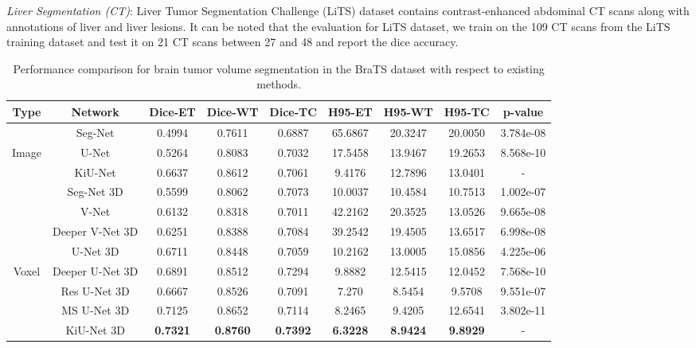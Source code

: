 \documentclass[journal,twoside,web]{ieeecolor}
\begin{document}
\noindent\textit{Liver Segmentation (CT)}:  Liver Tumor Segmentation Challenge (LiTS) dataset \cite{bilic2019liver} contains contrast-­enhanced abdominal CT scans along with annotations of liver and liver lesions.  It can be noted that the evaluation for LiTS dataset, we train on the 109 CT scans from the LiTS training dataset and test it on 21 CT scans between 27 and 48 and report the dice accuracy. 




\begin{table*}[]
	\caption{Performance comparison for brain tumor volume segmentation in the BraTS dataset with respect to existing methods.}
	\begin{tabular}{c|c|c|c|c|c|c|c|c}
		\hline
		Type & Network & Dice-ET & Dice-WT & Dice-TC & H95-ET & H95-WT & H95-TC &p-value \\ \hline
		& Seg-Net \cite{badrinarayanan2017segnet} &0.4994  &0.7611  &0.6887  &65.6867  &20.3247  &20.0050 & 3.784e-08  \\
		Image & U-Net \cite{ronneberger2015u}&0.5264  &0.8083  &0.7032  &17.5458  &13.9467  &19.2653 &8.568e-10  \\
		& KiU-Net &0.6637  &0.8612 &0.7061  &9.4176  &12.7896  &13.0401 &- \\ \hline
		& Seg-Net 3D \cite{badrinarayanan2017segnet}&0.5599  &0.8062  &0.7073  &10.0037  &10.4584  &10.7513 &1.002e-07 \\
		
		& V-Net  \cite{milletari2016v}& 0.6132 & 0.8318 & 0.7011 & 42.2162 & 20.3525 & 13.0526 &9.665e-08\\
		& Deeper V-Net 3D \cite{milletari2016v}& 0.6251 & 0.8388 & 0.7084 & 39.2542 & 19.4505 & 13.6517 & 6.998e-08\\
		
		& U-Net 3D \cite{cciccek20163d}& 0.6711 & 0.8448 & 0.7059 & 10.2162 & 13.0005 & 15.0856  & 4.225e-06 \\
		Voxel   & Deeper U-Net 3D \cite{cciccek20163d}& 0.6891 & 0.8512 & 0.7294 & 9.8882 & 12.5415 & 12.0452  & 7.568e-10\\
		& Res U-Net 3D \cite{bhalerao2019brain}& 0.6667 & 0.8526 & 0.7091 & 7.270 & 8.5454 & 9.5708  & 9.551e-07\\
		
		& MS U-Net 3D \cite{jesson2017brain, cciccek20163d}& 0.7125 & 0.8652 & 0.7114 & 8.2465 & 9.4205 & 12.6541  & 3.802e-11 \\
		
		& KiU-Net 3D & \textbf{0.7321} & \textbf{0.8760} & \textbf{0.7392} & \textbf{6.3228} & \textbf{8.9424} & \textbf{9.8929} &-\\
		
	\end{tabular}
	\label{brats}
	\centering
\end{table*}
\end{document}
